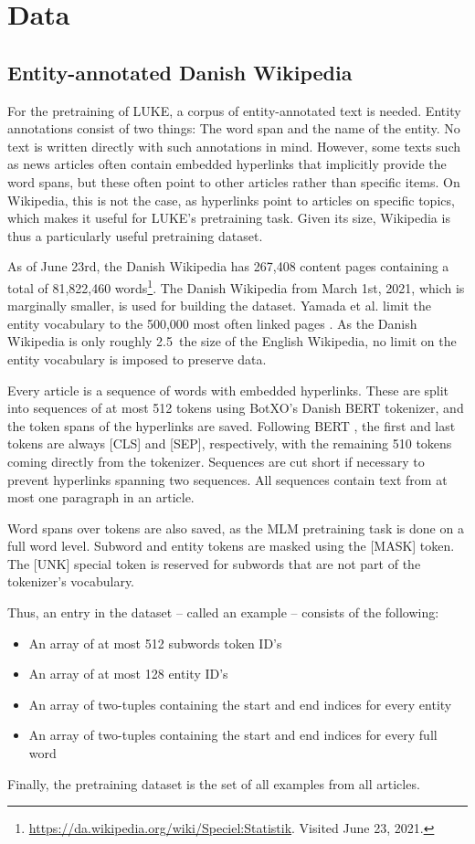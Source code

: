 \documentclass[main.tex]{subfiles}
\begin{document}
\chapter{Data}
\label{chap:data}

\section{Entity-annotated Danish Wikipedia}
\label{sec:dawiki}
For the pretraining of LUKE, a corpus of entity-annotated text is needed.
Entity annotations consist of two things: The word span and the name of the entity.
No text is written directly with such annotations in mind.
However, some texts such as news articles often contain embedded hyperlinks that implicitly provide the word spans, but these often point to other articles rather than specific items.
On Wikipedia, this is not the case, as hyperlinks point to articles on specific topics, which makes it useful for LUKE's pretraining task.
Given its size, Wikipedia is thus a particularly useful pretraining dataset.

As of June 23rd, the Danish Wikipedia has 267,408 content pages containing a total of 81,822,460 words\footnote{\url{https://da.wikipedia.org/wiki/Speciel:Statistik}. Visited June 23, 2021.}.
The Danish Wikipedia from March 1st, 2021, which is marginally smaller, is used for building the dataset.
Yamada et al. limit the entity vocabulary to the 500,000 most often linked pages \cite{yamada2020luke}.
As the Danish Wikipedia is only roughly 2.5\pro\ the size of the English Wikipedia, no limit on the entity vocabulary is imposed to preserve data.

Every article is a sequence of words with embedded hyperlinks.
These are split into sequences of at most 512 tokens using BotXO's Danish BERT tokenizer, and the token spans of the hyperlinks are saved.
Following BERT \cite{devlin2019bert}, the first and last tokens are always [CLS] and [SEP], respectively, with the remaining 510 tokens coming directly from the tokenizer.
Sequences are cut short if necessary to prevent hyperlinks spanning two sequences.
All sequences contain text from at most one paragraph in an article.

Word spans over tokens are also saved, as the MLM pretraining task is done on a full word level.
Subword and entity tokens are masked using the [MASK] token.
The [UNK] special token is reserved for subwords that are not part of the tokenizer's vocabulary.

Thus, an entry in the dataset -- called an example -- consists of the following:
\begin{itemize}
    \item An array of at most 512 subwords token ID's
    \item An array of at most 128 entity ID's
    \item An array of two-tuples containing the start and end indices for every entity
    \item An array of two-tuples containing the start and end indices for every full word
\end{itemize}
Finally, the pretraining dataset is the set of all examples from all articles.
\end{document}
